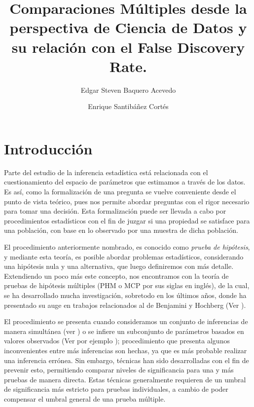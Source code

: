 \documentclass[11pt,letterpaper]{article}
\title{Comparaciones Múltiples desde la perspectiva de Ciencia de Datos y su relación con el False Discovery Rate.}
\author{Edgar Steven Baquero Acevedo \and Enrique Santibáñez Cortés}
\begin{document}
\maketitle
\section{Introducción}
Parte del estudio de la inferencia estadística está relacionada con el cuestionamiento del espacio de parámetros que estimamos a través de los datos. Es así, como la formalización de una pregunta se vuelve conveniente desde el punto de vista teórico, pues nos permite abordar preguntas con el rigor necesario para tomar una decisión. Esta formalización puede ser llevada a cabo por procedimientos estadísticos con el fin de juzgar si una propiedad se satisface para una población, con base en lo observado por una muestra de dicha población.

El procedimiento anteriormente nombrado, es conocido como \textit{prueba de hipótesis}, y mediante esta teoría, es posible abordar problemas estadísticos, considerando una hipótesis nula y una alternativa, que luego definiremos con más detalle. Extendiendo un poco más este concepto, nos encontramos con la teoría de pruebas de hipótesis múltiples (PHM o MCP por sus siglas en inglés), de la cual, se ha desarrollado mucha investigación, sobretodo en los últimos años, donde ha presentado su auge en trabajos relacionados al de Benjamini y Hochberg (Ver \cite{BH}).%

El procedimiento se presenta cuando consideramos un conjunto de inferencias de manera simultánea (ver \cite{Miller} ) %
 o se infiere un subconjunto de parámetros basados en valores observados (Ver por ejemplo \cite{Benjamini-2010});%
 procedimiento que presenta algunos inconvenientes entre más inferencias son hechas, ya que es más probable realizar una inferencia errónea. Sin embargo, técnicas han sido desarrolladas con el fin de prevenir esto, permitiendo comparar niveles de significancia para una y más pruebas de manera directa. Estas técnicas generalmente requieren de un umbral de significancia más estricto para pruebas individuales, a cambio de poder compensar el umbral general de una prueba múltiple.
 	
\end{document}
